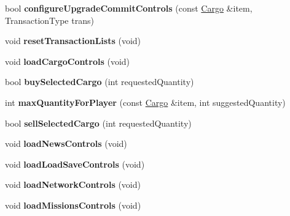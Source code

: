 \begin{DoxyCompactItemize}
\item 
bool {\bfseries configure\+Upgrade\+Commit\+Controls} (const \hyperlink{classCargo}{Cargo} \&item, Transaction\+Type trans)\hypertarget{classBaseComputer_a65967ac5cb95cf30e9cb27050545f2e5}{}\label{classBaseComputer_a65967ac5cb95cf30e9cb27050545f2e5}

\item 
void {\bfseries reset\+Transaction\+Lists} (void)\hypertarget{classBaseComputer_af7ae9f28684435578a2ff543d203dfcd}{}\label{classBaseComputer_af7ae9f28684435578a2ff543d203dfcd}

\item 
void {\bfseries load\+Cargo\+Controls} (void)\hypertarget{classBaseComputer_ae4e5a8f2dd6eec8d637fabf517d4318c}{}\label{classBaseComputer_ae4e5a8f2dd6eec8d637fabf517d4318c}

\item 
bool {\bfseries buy\+Selected\+Cargo} (int requested\+Quantity)\hypertarget{classBaseComputer_a91d8f2540ee5af3c528fb727419c5f56}{}\label{classBaseComputer_a91d8f2540ee5af3c528fb727419c5f56}

\item 
int {\bfseries max\+Quantity\+For\+Player} (const \hyperlink{classCargo}{Cargo} \&item, int suggested\+Quantity)\hypertarget{classBaseComputer_ab3e33112ed06a29322d44b79773e1ad0}{}\label{classBaseComputer_ab3e33112ed06a29322d44b79773e1ad0}

\item 
bool {\bfseries sell\+Selected\+Cargo} (int requested\+Quantity)\hypertarget{classBaseComputer_abb68056b076a55e97d5ef24439ef3284}{}\label{classBaseComputer_abb68056b076a55e97d5ef24439ef3284}

\item 
void {\bfseries load\+News\+Controls} (void)\hypertarget{classBaseComputer_a8cf0bbd4d696718181c38f4750b6c888}{}\label{classBaseComputer_a8cf0bbd4d696718181c38f4750b6c888}

\item 
void {\bfseries load\+Load\+Save\+Controls} (void)\hypertarget{classBaseComputer_a632e70dd4a23db04a51ae0351c48943b}{}\label{classBaseComputer_a632e70dd4a23db04a51ae0351c48943b}

\item 
void {\bfseries load\+Network\+Controls} (void)\hypertarget{classBaseComputer_a828650b1f00213913e417d73ce6c8ec3}{}\label{classBaseComputer_a828650b1f00213913e417d73ce6c8ec3}

\item 
void {\bfseries load\+Missions\+Controls} (void)\hypertarget{classBaseComputer_afcfd0c3a9a27a80d832b0c75ce0ffeb2}{}\label{classBaseComputer_afcfd0c3a9a27a80d832b0c75ce0ffeb2}


\end{DoxyCompactItemize}
